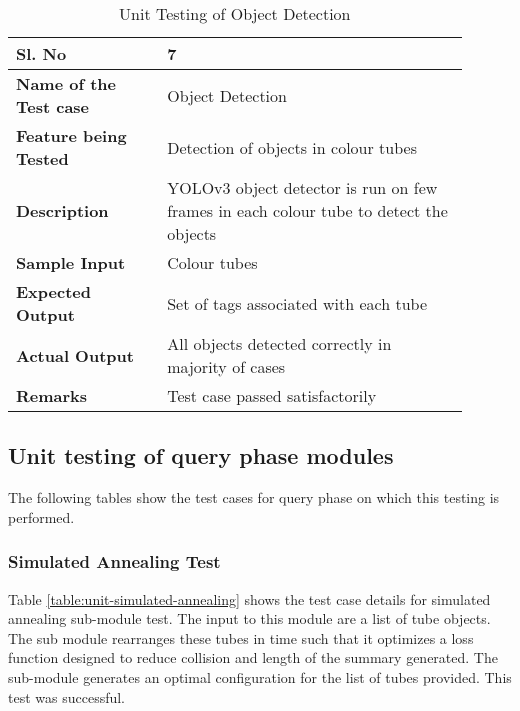         \FloatBarrier
        \begin{table}[H]
            \begin{tabular}{|p{0.3\linewidth}|p{0.6\linewidth}|}
                \hline
                \textbf{Sl. No }              &\textbf{ 7}\\
                \hline
                \textbf{Name of the Test case}  & Object Detection \\
                \hline
                \textbf{Feature being Tested}  & Detection of objects in colour tubes \\
                \hline
                \textbf{Description}           & YOLOv3 object detector is run on few frames in each colour tube to detect the objects \\
                \hline
                \textbf{Sample Input}          & Colour tubes \\
                \hline
                \textbf{Expected Output}       & Set of tags associated with each tube \\
                \hline
                \textbf{Actual Output}         & All objects detected correctly in majority of cases \\
                \hline
                \textbf{Remarks }              & Test case passed satisfactorily \\
                \hline
            \end{tabular}
            \caption{Unit Testing of Object Detection}
            \label{table:unit-object-detection}
        \end{table}


    \subsection{Unit testing of query phase modules}
    The following tables show the test cases for query phase on which this testing is performed.

        \subsubsection{Simulated Annealing Test}

        Table \ref{table:unit-simulated-annealing} shows the test case details for simulated annealing sub-module test. The input to this module are a list of tube objects. The sub module rearranges these tubes in time such that it optimizes a loss function designed to reduce collision and length of the summary generated. The sub-module generates an optimal configuration for the list of tubes provided. This test was successful.

